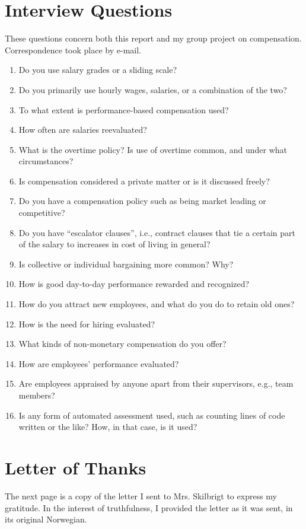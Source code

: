 \documentclass[letterpaper, 12pt]{report}
\begin{document}
\chapter{Interview Questions}
These questions concern both this report and my group project on compensation. Correspondence took place by e-mail.
\begin{enumerate}[leftmargin=*]
	\item Do you use salary grades or a sliding scale?
	\item Do you primarily use hourly wages, salaries, or a combination of the two?
	\item To what extent is performance-based compensation used?
	\item How often are salaries reevaluated?
	\item What is the overtime policy? Is use of overtime common, and under what circumstances?
	\item Is compensation considered a private matter or is it discussed freely?
	\item Do you have a compensation policy such as being market leading or competitive?
	\item Do you have ``escalator clauses'', i.e., contract clauses that tie a certain part of the salary to increases in cost of living in general?
	\item Is collective or individual bargaining more common? Why?
	\item How is good day-to-day performance rewarded and recognized?
	\item How do you attract new employees, and what do you do to retain old ones?
	\item How is the need for hiring evaluated?
	\item What kinds of non-monetary compensation do you offer?
	\item How are employees' performance evaluated?
	\item Are employees appraised by anyone apart from their supervisors, e.g., team members?
	\item Is any form of automated assessment used, such as counting lines of code written or the like? How, in that case, is it used?
\end{enumerate}





\chapter{Letter of Thanks}
The next page is a copy of the letter I sent to Mrs. Skilbrigt to express my gratitude. 
In the interest of truthfulness, I provided the letter as it was sent, in its original Norwegian.
\end{document}
